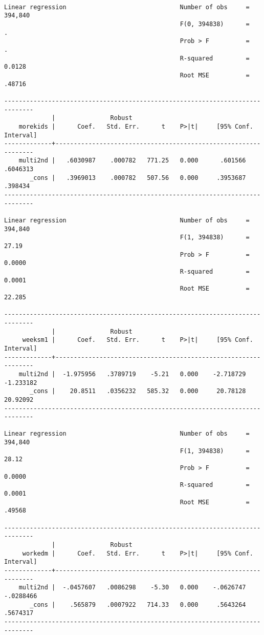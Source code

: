 \documentclass[11pt]{article}
\begin{document}
\begin{verbatim}

Linear regression                               Number of obs     =    394,840
                                                F(0, 394838)      =          .
                                                Prob > F          =          .
                                                R-squared         =     0.0128
                                                Root MSE          =     .48716

------------------------------------------------------------------------------
             |               Robust
    morekids |      Coef.   Std. Err.      t    P>|t|     [95% Conf. Interval]
-------------+----------------------------------------------------------------
    multi2nd |   .6030987    .000782   771.25   0.000      .601566    .6046313
       _cons |   .3969013    .000782   507.56   0.000     .3953687     .398434
------------------------------------------------------------------------------

Linear regression                               Number of obs     =    394,840
                                                F(1, 394838)      =      27.19
                                                Prob > F          =     0.0000
                                                R-squared         =     0.0001
                                                Root MSE          =     22.285

------------------------------------------------------------------------------
             |               Robust
     weeksm1 |      Coef.   Std. Err.      t    P>|t|     [95% Conf. Interval]
-------------+----------------------------------------------------------------
    multi2nd |  -1.975956   .3789719    -5.21   0.000    -2.718729   -1.233182
       _cons |    20.8511   .0356232   585.32   0.000     20.78128    20.92092
------------------------------------------------------------------------------

Linear regression                               Number of obs     =    394,840
                                                F(1, 394838)      =      28.12
                                                Prob > F          =     0.0000
                                                R-squared         =     0.0001
                                                Root MSE          =     .49568

------------------------------------------------------------------------------
             |               Robust
     workedm |      Coef.   Std. Err.      t    P>|t|     [95% Conf. Interval]
-------------+----------------------------------------------------------------
    multi2nd |  -.0457607   .0086298    -5.30   0.000    -.0626747   -.0288466
       _cons |    .565879   .0007922   714.33   0.000     .5643264    .5674317
------------------------------------------------------------------------------
\end{verbatim}
\end{document}

